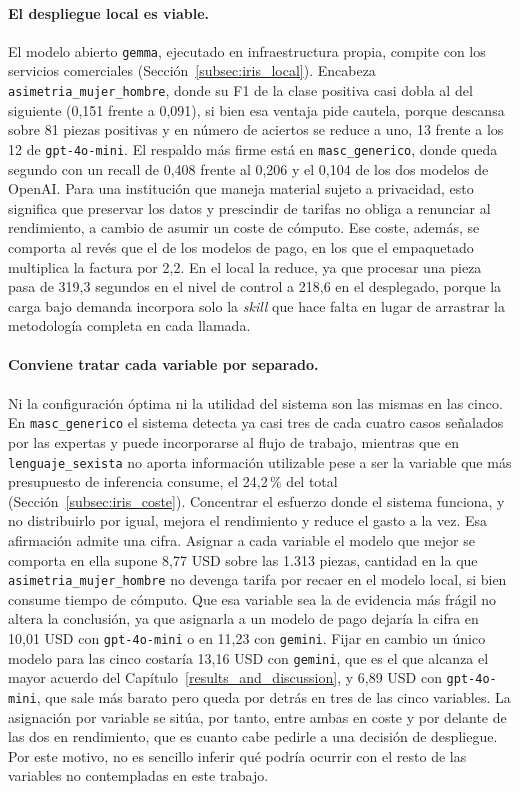 \paragraph{El despliegue local es viable.} El modelo abierto \texttt{gemma},
ejecutado en infraestructura propia, compite con los servicios comerciales
(Sección~\ref{subsec:iris_local}). Encabeza \texttt{asimetria\_mujer\_hombre}, donde su
F1 de la clase positiva casi dobla al del siguiente (0,151 frente a 0,091), si bien esa
ventaja pide cautela, porque descansa sobre 81 piezas positivas y en número de aciertos
se reduce a uno, 13 frente a los 12 de \texttt{gpt-4o-mini}. El respaldo más firme está
en \texttt{masc\_generico}, donde queda segundo con un recall de 0,408 frente al 0,206
y el 0,104 de los dos modelos de OpenAI. Para una institución que maneja material sujeto
a privacidad, esto significa que preservar los datos y prescindir de tarifas no
obliga a renunciar al rendimiento, a cambio de asumir un coste de cómputo. Ese coste,
además, se comporta al revés que el de los modelos de pago, en los que el empaquetado
multiplica la factura por 2,2. En el local la reduce, ya que procesar una pieza pasa
de 319,3 segundos en el nivel de control a 218,6 en el desplegado, porque la carga bajo
demanda incorpora solo la \textit{skill} que hace falta en lugar de arrastrar la
metodología completa en cada llamada.

\paragraph{Conviene tratar cada variable por separado.} Ni la configuración óptima
ni la utilidad del sistema son las mismas en las cinco. En
\texttt{masc\_generico} el sistema detecta ya casi tres de cada cuatro casos
señalados por las expertas y puede incorporarse al flujo de trabajo, mientras que en
\texttt{lenguaje\_sexista} no aporta información utilizable pese a ser la variable
que más presupuesto de inferencia consume, el 24,2\,\% del total
(Sección~\ref{subsec:iris_coste}).
Concentrar el esfuerzo donde el sistema funciona, y no distribuirlo por igual,
mejora el rendimiento y reduce el gasto a la vez. Esa afirmación admite una cifra.
Asignar a cada variable el modelo que mejor se comporta en ella supone 8,77 USD sobre
las 1.313 piezas, cantidad en la que \texttt{asimetria\_mujer\_hombre} no devenga
tarifa por recaer en el modelo local, si bien consume tiempo de cómputo. Que esa
variable sea la de evidencia más frágil no altera la conclusión, ya que asignarla a un
modelo de pago dejaría la cifra en 10,01 USD con \texttt{gpt-4o-mini} o en 11,23 con
\texttt{gemini}. Fijar en
cambio un único modelo para las cinco costaría 13,16 USD con \texttt{gemini}, que es el
que alcanza el mayor acuerdo del Capítulo~\ref{results_and_discussion}, y 6,89 USD con \texttt{gpt-4o-mini}, que
sale más barato pero queda
por detrás en tres de las cinco variables. La asignación por variable se sitúa, por
tanto, entre ambas en coste y por delante de las dos en rendimiento, que es cuanto cabe
pedirle a una decisión de despliegue. Por este motivo, no es sencillo inferir qué podría ocurrir con el resto de las variables no contempladas en este trabajo.

